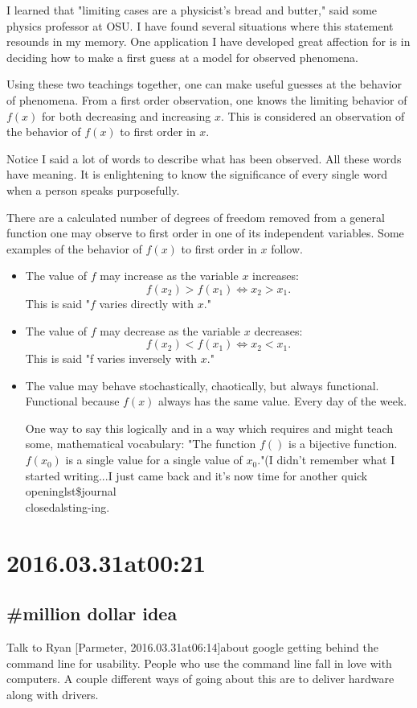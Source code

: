 I learned that "limiting cases are a physicist's bread and butter," said some physics professor at OSU. I have found several situations where this statement resounds in my memory. One application I have developed great affection for is in deciding how to make a first guess at a model for observed phenomena.

Using these two teachings together, one can make useful guesses at the behavior of phenomena. From a first order observation, one knows the limiting behavior of $f(x)$ for both decreasing and increasing $x$. This is considered an observation of the behavior of $f(x)$ to first order in $x$.

Notice I said a lot of words to describe what has been observed. All these words have meaning. It is enlightening to know the significance of every single word when a person speaks purposefully.

There are a calculated number of degrees of freedom removed from a general function one may observe to first order in one of its independent variables. Some examples of the behavior of $f(x)$ to first order in $x$ follow.

\begin{itemize}
  \item The value of $f$ may increase as the variable $x$ increases:$$f(x_2) > f(x_1) \Leftrightarrow x_2 > x_1.$$ This is said "$f$ varies directly with $x$."
   \item The value of $f$ may decrease as the variable $x$ decreases:$$f(x_2) < f(x_1) \Leftrightarrow x_2 < x_1.$$ This is said "f varies inversely with $x$."
   \item The value may behave stochastically, chaotically, but always functional. Functional because $f(x)$ always has the same value. Every day of the week.

One way to say this logically and in a way which requires and might teach some, mathematical vocabulary:
"The function $f()$ is a bijective function. $f(x_0)$ is a single value for a single value of $x_0$."(I didn't remember what I started writing...I just came back and it's now time for another quick \\openinglst\$journal\\closedalsting-ing.
\end{itemize}

\section*{ 2016.03.31at00:21 }
\subsection*{\#{million dollar idea}}
Talk to Ryan [Parmeter, 2016.03.31at06:14]about google getting behind the command line for usability. People who use the command line fall in love with computers. A couple different ways of going about this are to deliver hardware along with drivers.


